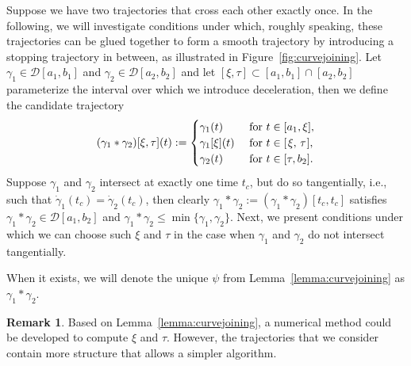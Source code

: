 \documentclass[a4paper]{article}
\theoremstyle{definition}
\newtheorem{remark}{Remark}
\theoremstyle{plain}
\begin{document}
Suppose we have two trajectories that cross each other exactly once. In the
following, we will investigate conditions under which, roughly speaking, these
trajectories can be glued together to form a smooth trajectory by introducing a
stopping trajectory in between, as illustrated in Figure~\ref{fig:curvejoining}.
%
Let $\gamma_{1} \in \mathcal{D}[a_{1}, b_{1}]$ and
$\gamma_{2} \in \mathcal{D}[a_{2}, b_{2}]$ and let
$[\xi, \tau] \subset [a_{1}, b_{1}] \cap [a_{2}, b_{2}]$ parameterize the interval over
which we introduce deceleration, then we define the candidate trajectory
\begin{align*}
  (\gamma_{1} * \gamma_{2})[\xi, \tau](t) :=
    \begin{cases}
      \gamma_{1}(t) &\text{ for } t \in [a_{1}, \xi] , \\
      \gamma_{1}[\xi](t) &\text{ for } t \in [\hspace{0.1em} \xi, \, \tau \hspace{0.05em} ] , \\
      \gamma_{2}(t) &\text{ for } t \in [\tau, b_{2}] .
    \end{cases}
\end{align*}
%
Suppose $\gamma_{1}$ and $\gamma_{2}$ intersect at exactly one time $t_{c}$, but do so
tangentially, i.e., such that $\dot{\gamma}_{1}(t_{c}) = \dot{\gamma}_{2}(t_{c})$, then
clearly $\gamma_{1} * \gamma_{2} := (\gamma_{1} * \gamma_{2})[t_{c}, t_{c}]$ satisfies
$\gamma_{1} * \gamma_{2} \in \mathcal{D}[a_{1}, b_{2}]$ and
$\gamma_{1} * \gamma_{2} \leq \min\{\gamma_{1}, \gamma_{2}\}$. Next, we present conditions under which we
can choose such $\xi$ and $\tau$ in the case when $\gamma_{1}$ and $\gamma_{2}$ do not
intersect tangentially.

When it exists, we will denote the unique $\psi$ from
Lemma~\ref{lemma:curvejoining} as $\gamma_{1} * \gamma_{2}$.


\begin{remark}
  Based on Lemma~\ref{lemma:curvejoining}, a numerical method could be developed
  to compute $\xi$ and $\tau$. However, the trajectories that we consider
  contain more structure that allows a simpler algorithm.
\end{remark}
\end{document}

